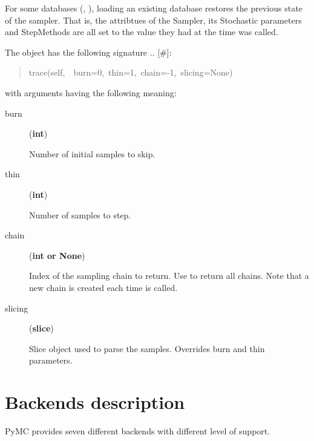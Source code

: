 For some databases (, ), loading an existing database restores the previous state of the sampler. That is, the attribtues of the Sampler, its Stochastic parameters and StepMethods are all set to the value they had at the time  was called.

The  object has the following signature .. {[}{\#}{]}:
\begin{quote}{\ttfamily \raggedright \noindent
trace(self,~~burn=0,~thin=1,~chain=-1,~slicing=None)
}\end{quote}

with arguments having the following meaning:
\begin{description}
\item[{burn}] \leavevmode (\textbf{int})

Number of initial samples to skip.

\item[{thin}] \leavevmode (\textbf{int})

Number of samples to step.

\item[{chain}] \leavevmode (\textbf{int or None})

Index of the sampling chain to return. Use  to return all chains. Note that a new chain is created each time  is called.

\item[{slicing}] \leavevmode (\textbf{slice})

Slice object used to parse the samples. Overrides burn and thin parameters.

\end{description}



\hypertarget{backends-description}{}
\section*{Backends description}
\label{backends-description}

PyMC provides seven different backends with different level of support.


